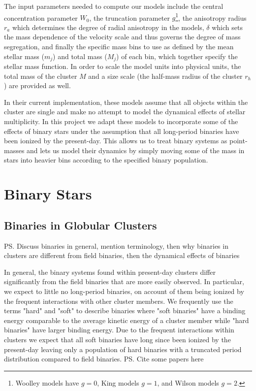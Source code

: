 The input parameters needed to compute our models include the central concentration parameter $W_0$,
the truncation parameter $g$\footnote{Woolley models \citep{Woolley1954} have $g=0$, King models
	\citep{King1966} $g=1$, and Wilson models \citep{Wilson1975} $g=2$.}, the anisotropy radius $r_a$
which determines the degree of radial anisotropy in the models, $\delta$ which sets the mass
dependence of the velocity scale and thus governs the degree of mass segregation, and finally the
specific mass bins to use as defined by the mean stellar mass ($m_j$) and total mass ($M_j$) of each
bin, which together specify the stellar mass function. In order to scale the model units into
physical units, the total mass of the cluster $M$ and a size scale (the half-mass radius of the
cluster $r_h$) are provided as well.


In their current implementation, these models assume that all objects within the cluster are single
and make no attempt to model the dynamical effects of stellar multiplicity. In this project we adapt
these models to incorporate some of the effects of binary stars under the assumption that all
long-period binaries have been ionized by the present-day. This allows us to treat binary systems as
point-masses and lets us model their dynamics by simply moving some of the mass in stars into
heavier bins according to the specified binary population.



\section{Binary Stars}
\subsection{Binaries in Globular Clusters}

\ps{Discuss binaries in general, mention terminology, then why binaries in clusters are different
	from field binaries, then the dynamical effects of binaries}

In general, the binary systems found within present-day clusters differ significantly from the field
binaries that are more easily observed. In particular, we expect to little no long-period binaries,
on account of them being ionized by the frequent interactions with other cluster members. We
frequently use the terms "hard" and "soft" to describe binaries where "soft binaries" have a binding
energy comparable to the average kinetic energy of a cluster member while "hard binaries" have
larger binding energy. Due to the frequent interactions within clusters we expect that all soft
binaries have long since been ionized by the present-day leaving only a population of hard binaries
with a truncated period distribution compared to field binaries.
\ps{Cite some papers here}

